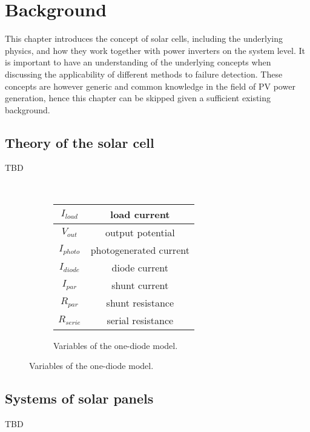 \chapter{Background}
This chapter introduces the concept of solar cells, including the underlying physics,
and how they work together with power inverters on the system level.
It is important to have an understanding of the underlying concepts when discussing the applicability of different methods to failure detection.
These concepts are however generic and common knowledge in the field of PV power generation, 
hence this chapter can be skipped given a sufficient existing background.

\section{Theory of the solar cell}
TBD

\begin{figure}[here]
\centering

~
\begin{subfigure}[b]{0.4\textwidth}
  \begin{tabular}{| c | c |}
  \hline
  $I_{load}$ & load current \\ \hline
  $V_{out}$ & output potential \\ \hline
  $I_{photo}$ & photogenerated current \\ \hline
  $I_{diode}$ & diode current \\ \hline
  $I_{par}$ & shunt current \\ \hline
  $R_{par}$ & shunt resistance \\ \hline
  $R_{serie}$ & serial resistance \\ \hline
  \end{tabular}
  \caption[solar-cell-variables]{Variables of the one-diode model.}
  \label{fig:one-diode-model-vars}
\end{subfigure}

\end{figure}


\section{Systems of solar panels}
TBD

